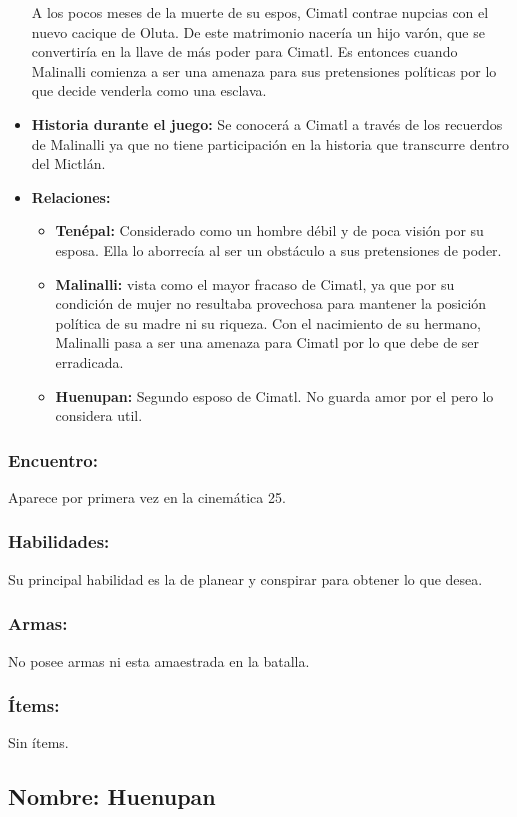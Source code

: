 \documentclass[11pt,letterpaper]{article}
\begin{document}
\begin{itemize}
	A los pocos meses de la muerte de su espos, Cimatl contrae nupcias con el nuevo cacique de Oluta. De este matrimonio nacería un hijo varón, que se convertiría en la llave de más poder para Cimatl. Es entonces cuando Malinalli comienza a ser una amenaza para sus pretensiones políticas por lo que decide venderla como una esclava.  
	\item \textbf{Historia durante el juego:}
	Se conocerá a Cimatl a través de los recuerdos de Malinalli ya que no tiene participación en la historia que transcurre dentro del Mictlán.
	\item \textbf{Relaciones:}
	\begin{itemize}
		\item \textbf{Tenépal:} Considerado como un hombre débil y de poca visión por su esposa. Ella lo aborrecía al ser un obstáculo a sus pretensiones de poder. 
		\item \textbf{Malinalli:} vista como el mayor fracaso de Cimatl, ya que por su condición de mujer no resultaba provechosa para mantener la posición política de su madre ni su riqueza. Con el nacimiento de su hermano, Malinalli pasa a ser una amenaza para Cimatl por lo que debe de ser erradicada.
		\item \textbf{Huenupan:} Segundo esposo de Cimatl. No guarda amor por el pero lo considera util.
	\end{itemize}                     
\end{itemize}

\subsubsection{Encuentro:}
Aparece por primera vez en la cinemática 25.
\subsubsection{Habilidades:}
Su principal habilidad es la de planear y conspirar para obtener lo que desea.
\subsubsection{Armas:}
No posee armas ni esta amaestrada en la batalla.
\subsubsection{Ítems:}
Sin ítems.


\subsection{Nombre: Huenupan}  
\end{document}
